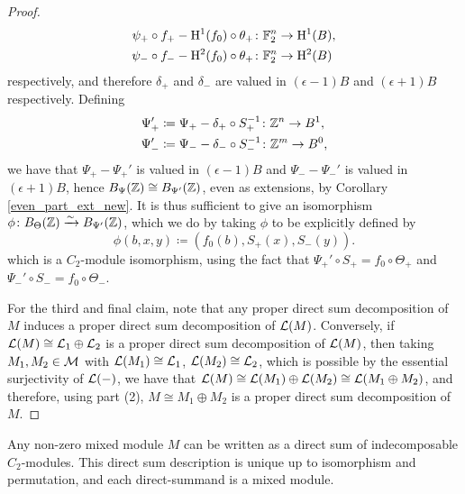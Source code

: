 \begin{proof}
  \begin{align*}
    \psi_+ \circ f_+ - \mathrm{H}^1(f_0) \circ \theta_+ &\colon {\mathbb F}_2^n \rightarrow \mathrm{H}^1(B), \\
    \psi_- \circ f_- - \mathrm{H}^2(f_0) \circ \theta_+ &\colon {\mathbb F}_2^n \rightarrow \mathrm{H}^2(B)
  \end{align*}
  respectively, and therefore $\delta_+$ and $\delta_-$ are valued in $(\epsilon - 1)B$ and $(\epsilon + 1)B$ respectively. Defining
  \begin{align*}
    \Psi_+' &\coloneqq \Psi_+ - \delta_+ \circ S_+^{-1} \colon {\mathbb Z}^n \rightarrow B^1, \\
    \Psi_-' &\coloneqq \Psi_- - \delta_- \circ S_-^{-1} \colon {\mathbb Z}^m \rightarrow B^0,
  \end{align*}
  we have that $\Psi_+ - \Psi_+'$ is valued in $(\epsilon - 1)B$ and $\Psi_- - \Psi_-'$ is valued in $(\epsilon + 1)B$, hence $B_{\Psi}({\mathbb Z}) \cong B_{\Psi'}({\mathbb Z})$, even as extensions, by Corollary \ref{even_part_ext_new}. It is thus sufficient to give an isomorphism $\phi \colon B_{\Theta}({\mathbb Z}) \xrightarrow{\sim} B_{\Psi'}({\mathbb Z})$, which we do by taking $\phi$ to be explicitly defined by
  \[
  \phi(b,x,y) \coloneqq (f_0(b),S_+(x), S_-(y)).
  \]
  which is a $C_2$-module isomorphism, using the fact that $\Psi_+' \circ S_+ = f_0 \circ \Theta_+$ and $\Psi_-' \circ S_- = f_0 \circ \Theta_-$.

  For the third and final claim, note that any proper direct sum decomposition of $M$ induces a proper direct sum decomposition of ${\mathcal L}(M)$. Conversely, if ${\mathcal L}(M) \cong {\mathcal L}_1 \oplus {\mathcal L}_2$ is a proper direct sum decomposition of ${\mathcal L}(M)$, then taking $M_1, M_2 \in {\mathcal M}$ with ${\mathcal L}(M_1) \cong {\mathcal L}_1$, ${\mathcal L}(M_2) \cong {\mathcal L}_2$, which is possible by the essential surjectivity of ${\mathcal L}(-)$, we have that ${\mathcal L}(M) \cong {\mathcal L}(M_1) \oplus {\mathcal L}(M_2) \cong {\mathcal L}(M_1 \oplus M_2)$, and therefore, using part (2), $M \cong M_1 \oplus M_2$ is a proper direct sum decomposition of $M$.
\end{proof}

\begin{cor}\label{cor:KSformixedmodules}
Any non-zero mixed module $M$ can be written as a direct sum of indecomposable $C_2$-modules. This direct sum description is unique up to isomorphism and permutation, and each direct-summand is a mixed module.
\end{cor}

